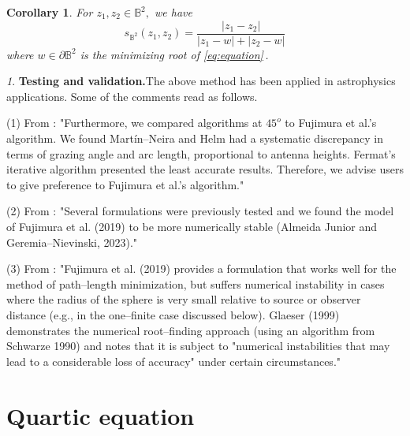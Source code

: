 \documentclass[12pt,a4paper]{amsart}
\theoremstyle{plain}
\newtheorem{cor}[equation]{Corollary}
\theoremstyle{definition}
\theoremstyle{remark}
\newtheorem{nonsec}[equation]{}
\numberwithin{equation}{section}
\begin{document}
\begin{cor}\label{cor:sDformula}
  For $z_1, z_2 \in \mathbb{B}^2,$ we have
  \begin{equation*}
    s_{\mathbb{B}^2}(z_1, z_2) = \frac{|z_1- z_2|}{|z_1-w|+ |z_2-w| }
  \end{equation*}
  where $w \in \partial {\mathbb{B}^2 } $ is the minimizing root of
  \eqref{eq:equation}\,.
\end{cor}


\begin{nonsec}{\bf Testing and validation.}\label{tstvali}
The above method has been applied in astrophysics applications.
Some of the comments read as follows.

(1) From \cite[p.7]{dg1}:
"Furthermore, we compared algorithms at $45^o$ to Fujimura et al.'s
algorithm. We found Mart\'in--Neira and Helm had a systematic discrepancy in terms of grazing angle and arc length, proportional to antenna
heights. Fermat's iterative algorithm presented the least accurate results. Therefore, we advise users to give preference to Fujimura et al.'s
algorithm."



 
% 
 
 
(2) From  \cite[p.3304]{dg2}: "Several formulations were previously tested and we found the model of Fujimura et al.
(2019) to be more numerically stable (Almeida Junior
and Geremia--Nievinski, 2023)."


(3) From \cite{mbm}: "Fujimura et al. (2019) provides a formulation that works well for the method of path--length minimization, but suffers numerical instability in cases where the radius of the sphere is very small relative to source or observer distance (e.g., in the one--finite case discussed below). Glaeser (1999) demonstrates the numerical root--finding approach (using an algorithm from Schwarze 1990) and notes that it is subject to "numerical instabilities that may lead to a considerable loss of accuracy" under certain circumstances."  

 \end{nonsec}
\vspace{3cm}



\section{Quartic equation}

\end{document}
